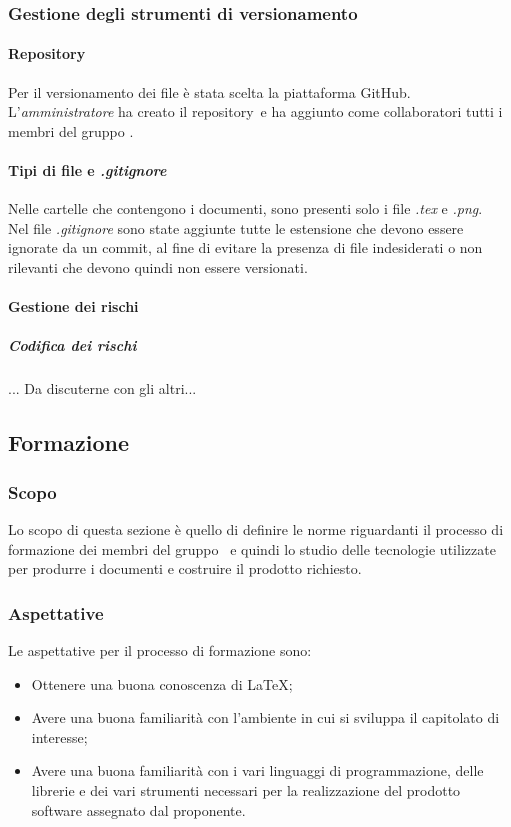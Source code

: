     \subsubsection{Gestione degli strumenti di versionamento}
      \paragraph{Repository\glo}
        Per il versionamento dei file è stata scelta la piattaforma GitHub\glo. L'\textit{amministratore} ha creato il repository\glo\ e ha aggiunto 
        come collaboratori tutti i membri del gruppo \groupName.

      \paragraph{Tipi di file e \textit{.gitignore}}
        Nelle cartelle che contengono i documenti, sono presenti solo i file \textit{.tex} e \textit{.png}.\\
        Nel file \textit{.gitignore} sono state aggiunte tutte le estensione che devono essere ignorate da un commit, al fine di evitare la presenza di file indesiderati 
        o non rilevanti che devono quindi non essere versionati.
      \paragraph {Gestione dei rischi}
      \subparagraph {Codifica dei rischi}
        ... Da discuterne con gli altri...



        \subsection{Formazione} \label{subsection: formazione}
        \subsubsection {Scopo}
        Lo scopo di questa sezione è quello di definire le norme riguardanti il processo di formazione dei membri del gruppo \groupName\ e quindi lo studio delle tecnologie utilizzate per produrre i documenti e costruire il prodotto richiesto.
        \subsubsection {Aspettative}
        Le aspettative per il processo di formazione sono:
        \begin {itemize}
          \item Ottenere una buona conoscenza di \LaTeX;
          \item Avere una buona familiarità con l'ambiente in cui si sviluppa il capitolato di interesse;
          \item Avere una buona familiarità con i vari linguaggi di programmazione, delle librerie e dei vari strumenti necessari per la realizzazione del prodotto software assegnato dal proponente.
        \end {itemize}
